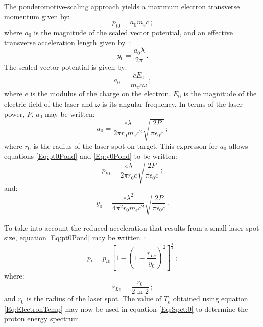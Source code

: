 The ponderomotive-scaling approach yields a maximum electron
transverse momentum given by:
\begin{equation}
  p_{t0} = a_0 m_e c \, ;
  \label{Eq:pt0Pond}
\end{equation}
where $a_0$ is the magnitude of the scaled vector potential, and an
effective transverse acceleration length given by~\cite{DOVER2020100847}:
\begin{equation}
  y_0 = \frac{a_0 \lambda}{2\pi} \, .
  \label{Eq:y0Pond}
\end{equation}
The scaled vector potential is given by:
\begin{equation}
  a_0 = \frac{e E_0}{m_e c \omega} \, ;
\end{equation}
where $e$ is the modulus of the charge on the electron, $E_0$ is the
magnitude of the electric field of the laser and $\omega$ is its 
angular frequency.
In terms of the laser power, $P$, $a_0$ may be written:
\begin{equation}
  a_0 = \frac{e \lambda}{2\pi r_0 m_e c^2}
           \sqrt{\frac{2 P}{\pi \epsilon_0 c}} \, ;
\end{equation}
where $r_0$ is the radius of the laser spot on target.
This expresson for $a_0$ allows equations \ref{Eq:pt0Pond}
and \ref{Eq:y0Pond} to be written:
\begin{equation}
  p_{t0} = \frac{e \lambda}{2\pi r_0 c} 
           \sqrt{\frac{2 P}{\pi \epsilon_0 c}} \, ;
  \label{Eq:pt0Pond1}
\end{equation}
and:
\begin{equation}
  y_0 = \frac{e \lambda^2}{4\pi^2 r_0 m_e c^2} 
           \sqrt{\frac{2 P}{\pi \epsilon_0 c}} \, .
  \label{Eq:y0Pond1}
\end{equation}

To take into account the reduced acceleration that results from a
small laser spot size, equation \ref{Eq:pt0Pond} may be
written~\cite{DOVER2020100847}: 
\begin{equation}
  p_t = p_{t0} \left[
                1 - \left(
                      1 - \frac{r_{Le}}{y_0}
                    \right)^2
              \right]^\frac{1}{2} \, ;
\end{equation}
where:
\begin{equation}
  r_{Le} = \frac{r_0}{2 \ln 2} \, ;
\end{equation}
and $r_0$ is the radius of the laser spot.
The value of $T_e$ obtained using equation \ref{Eq:ElectronTemp} may
now be used in equation \ref{Eq:Spct:0} to determine the proton energy
spectrum.


